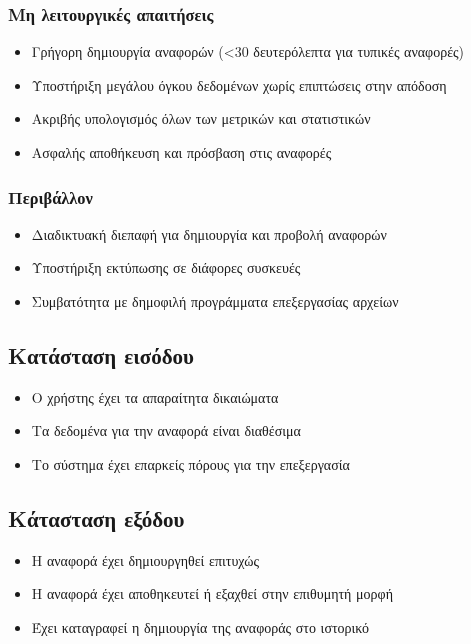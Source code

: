 \documentclass[12pt,a4paper,twoside]{book}
\begin{document}
\subsubsection{Μη λειτουργικές απαιτήσεις}
\begin{itemize}
  \item Γρήγορη δημιουργία αναφορών (<30 δευτερόλεπτα για τυπικές αναφορές)
  \item Υποστήριξη μεγάλου όγκου δεδομένων χωρίς επιπτώσεις στην απόδοση
  \item Ακριβής υπολογισμός όλων των μετρικών και στατιστικών
  \item Ασφαλής αποθήκευση και πρόσβαση στις αναφορές
\end{itemize}

\subsubsection{Περιβάλλον}
\begin{itemize}
  \item Διαδικτυακή διεπαφή για δημιουργία και προβολή αναφορών
  \item Υποστήριξη εκτύπωσης σε διάφορες συσκευές
  \item Συμβατότητα με δημοφιλή προγράμματα επεξεργασίας αρχείων
\end{itemize}

\subsection{Κατάσταση εισόδου}
\begin{itemize}
  \item Ο χρήστης έχει τα απαραίτητα δικαιώματα
  \item Τα δεδομένα για την αναφορά είναι διαθέσιμα
  \item Το σύστημα έχει επαρκείς πόρους για την επεξεργασία
\end{itemize}

\subsection{Κάτασταση εξόδου}
\begin{itemize}
  \item Η αναφορά έχει δημιουργηθεί επιτυχώς
  \item Η αναφορά έχει αποθηκευτεί ή εξαχθεί στην επιθυμητή μορφή
  \item Έχει καταγραφεί η δημιουργία της αναφοράς στο ιστορικό
\end{itemize}
\end{document}
